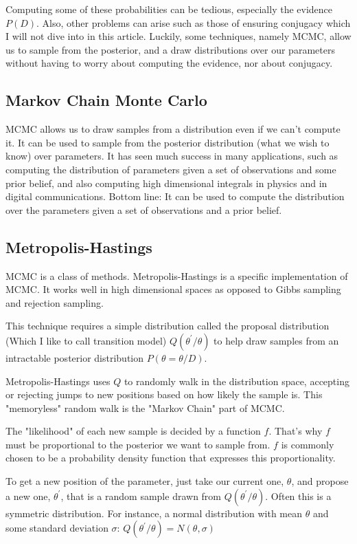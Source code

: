 Computing some of these probabilities can be tedious, especially the evidence $P(D)$. Also, other problems can arise such as those of ensuring conjugacy which I will not dive into in this article. Luckily, some techniques, namely MCMC, allow us to sample from the posterior, and a draw distributions over our parameters without having to worry about computing the evidence, nor about conjugacy.

\subsection{Markov Chain Monte Carlo}
MCMC allows us to draw samples from a distribution even if we can't compute it. It can be used to sample from the posterior distribution (what we wish to know) over parameters. It has seen much success in many applications, such as computing the distribution of parameters given a set of observations and some prior belief, and also computing high dimensional integrals in physics and in digital communications.
Bottom line: It can be used to compute the distribution over the parameters given a set of observations and a prior belief.

\subsection{Metropolis-Hastings}
MCMC is a class of methods. Metropolis-Hastings is a specific implementation of MCMC. It works well in high dimensional spaces as opposed to Gibbs sampling and rejection sampling.

This technique requires a simple distribution called the proposal distribution (Which I like to call transition model) $Q(\theta^\prime/\theta)$ to help draw samples from an intractable posterior distribution $P(\theta =\theta/D)$.

Metropolis-Hastings uses $Q$ to randomly walk in the distribution space, accepting or rejecting jumps to new positions based on how likely the sample is. This "memoryless" random walk is the "Markov Chain" part of MCMC.

The "likelihood" of each new sample is decided by a function $f$. That's why $f$ must be proportional to the posterior we want to sample from. $f$ is commonly chosen to be a probability density function that expresses this proportionality.

To get a new position of the parameter, just take our current one, $\theta$, and propose a new one, $\theta^\prime$, that is a random sample drawn from $Q(\theta^\prime/\theta)$. Often this is a symmetric distribution. For instance, a normal distribution with mean $\theta$ and some standard deviation $\sigma$: $Q(\theta^\prime/\theta) = N(\theta, \sigma)$

